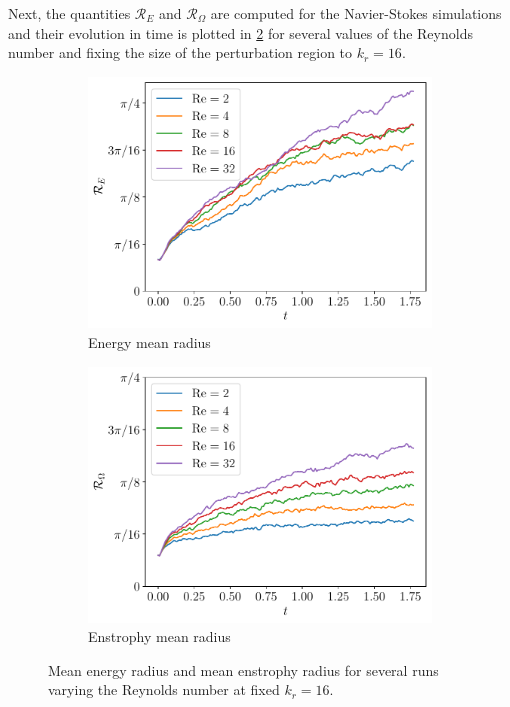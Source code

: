 \documentclass[../main.tex]{subfiles}
\begin{document}
Next, the quantities $\mathcal{R}_E$ and $\mathcal{R}_\Omega$ are computed for the Navier-Stokes simulations and their evolution in time is plotted in \cref{fig:energy_enstrophy_mean} for several values of the Reynolds number and fixing the size of the perturbation region to $k_r=16$.
\begin{figure}[ht]
	\centering
	\begin{subfigure}{0.44\textwidth}
		\centering
		\includegraphics[width=\textwidth]{images/EnergyMeanRadius_Re.kdn16.pdf}
		\caption{Energy mean radius}
	\end{subfigure}\hspace{0.04\textwidth}
	\begin{subfigure}{0.44\textwidth}
		\centering
		\includegraphics[width=\textwidth]{images/EnstrophyMeanRadius_Re.kdn16.pdf}
		\caption{Enstrophy mean radius}\label{fig:enstrophy_mean}
	\end{subfigure}
	\caption{Mean energy radius and mean enstrophy radius for several runs varying the Reynolds number at fixed $k_r=16$.}\label{fig:energy_enstrophy_mean}
\end{figure}
\end{document}
